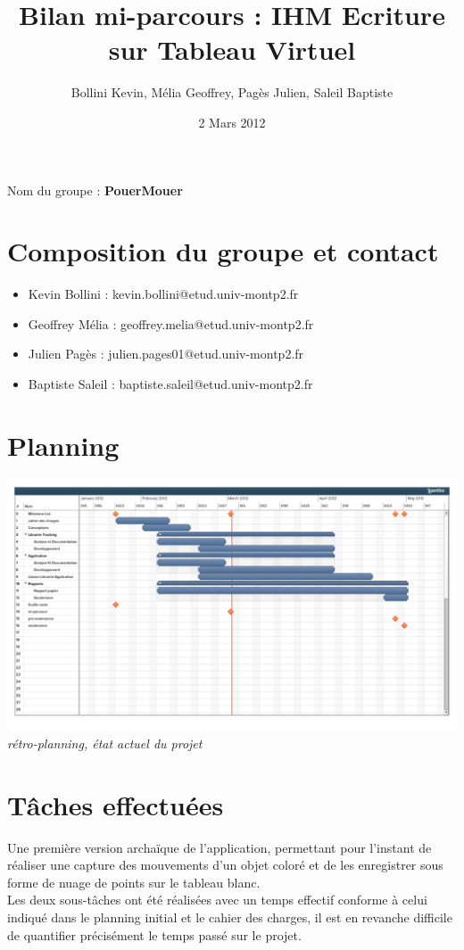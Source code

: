 \documentclass{article}
\title{Bilan mi-parcours : IHM Ecriture sur Tableau Virtuel}
\author{Bollini Kevin, Mélia Geoffrey, Pagès Julien, Saleil Baptiste}
\date{2 Mars 2012}
\begin{document}
\maketitle
	Nom du groupe : \textbf{PouerMouer}
	\section{Composition du groupe et contact}
	
	\begin{itemize}
	\item Kevin Bollini : kevin.bollini@etud.univ-montp2.fr \\
	\item Geoffrey Mélia : geoffrey.melia@etud.univ-montp2.fr \\
	\item Julien Pagès : julien.pages01@etud.univ-montp2.fr \\
	\item Baptiste Saleil : baptiste.saleil@etud.univ-montp2.fr \\
	\end{itemize} 	
	\section{Planning}
		\begin{center}
			\includegraphics[scale=0.3]{retroplanning.pdf}
			\it rétro-planning, état actuel du projet
		\end{center}
	\section{Tâches effectuées}
		Une première version archaïque de l'application, permettant pour l'instant de réaliser une capture des mouvements d'un objet coloré et de les enregistrer sous forme de nuage de points sur le tableau blanc. \\
		Les deux sous-tâches ont été réalisées avec un temps effectif conforme à celui indiqué dans le planning initial et le cahier des charges, il est en revanche difficile de quantifier précisément le temps passé sur le projet. \\
\end{document}

